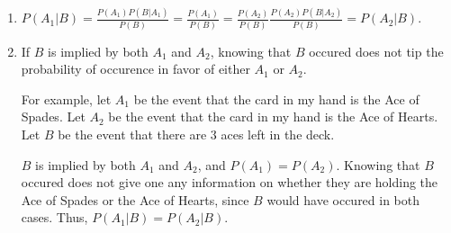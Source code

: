 \begin{enumerate}[label=(\alph*)]

\item $P(A_{1}|B) = \frac{P(A_{1})P(B|A_{1})}{P(B)} = \frac{P(A_{1})}{P(B)} = \frac{P(A_{2})}{P(B)} \frac{P(A_{2})P(B|A_{2})}{P(B)} = P(A_{2}|B)$.

\item If $B$ is implied by both $A_{1}$ and $A_{2}$, knowing that $B$ occured does not tip the probability of occurence in favor of either $A_{1}$ or $A_{2}$.

For example, let $A_{1}$ be the event that the card in my hand is the Ace of Spades. Let $A_{2}$ be the event that the card in my hand is the Ace of Hearts. Let $B$ be the event that there are $3$ aces left in the deck.

$B$ is implied by both $A_{1}$ and $A_{2}$, and $P(A_{1}) = P(A_{2})$. Knowing that $B$ occured does not give one any information on whether they are holding the Ace of Spades or the Ace of Hearts, since $B$ would have occured in both cases. Thus, $P(A_{1}|B) = P(A_{2}|B)$.
\end{enumerate}